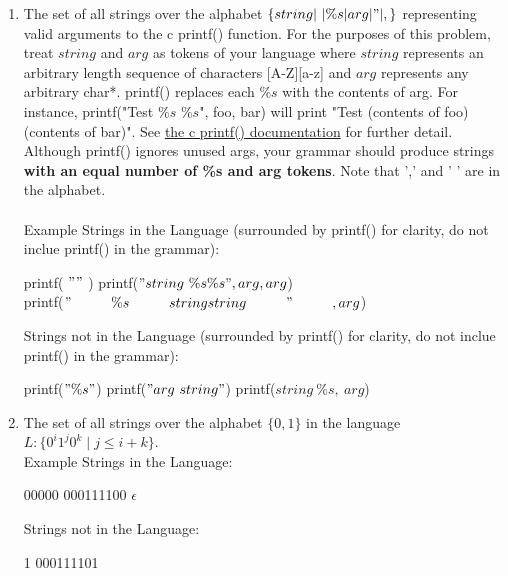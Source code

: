 \documentclass[11pt]{article}
\newcommand\tab[1][1cm]{\hspace*{#1}}
\begin{document}
\begin{enumerate}
\begin{enumerate}
    \item  The set of all strings over the alphabet $\{string|\ |\%s|arg|"|,\}$ representing valid arguments to the c printf() function. For the purposes of this problem, treat $string$ and $arg$ as tokens of your language where $string$ represents an arbitrary length sequence of characters [A-Z][a-z] and $arg$ represents any arbitrary char*. printf() replaces each $\%s$ with the contents of arg. For instance, printf("Test $\%s$ $\%s$", foo, bar) will print "Test (contents of foo) (contents of bar)". See \href{http://www.cplusplus.com/reference/cstdio/printf/}{the c printf() documentation} for further detail. Although printf() ignores unused args, your grammar should produce strings \textbf{with an equal number of \%s and arg tokens}. Note that ',' and ' ' are in the alphabet. \\ \\ 
    Example Strings in the Language (surrounded by printf() for clarity, do not inclue printf() in the grammar): 
    \begin{center}
    printf( $""$ ) \tab \tab  printf($"string\ \%s\%s", arg, arg$) \\  printf($"\tab \%s \tab stringstring\tab"\tab,arg$\tab)
    \end{center}
    Strings not in the Language (surrounded by printf() for clarity, do not inclue printf() in the grammar): 
    \begin{center}
    printf($"\%s"$)  \tab printf($"arg \ string"$)  \tab printf($string \ \%s , \ arg$)
    \end{center} 
    
    \item  The set of all strings over the alphabet $\{0, 1\}$ in the language $L:\{0^i1^j0^k \mid j \leq i + k\}$. \\ 
    Example Strings in the Language: 
    \begin{center}
    00000 \tab \tab 000111100  \tab \tab $\epsilon$ 
    \end{center}
    Strings not in the Language: 
    \begin{center}
    1   \tab \tab 000111101
    \end{center}
    

\end{enumerate}
\end{enumerate}
\end{document}
